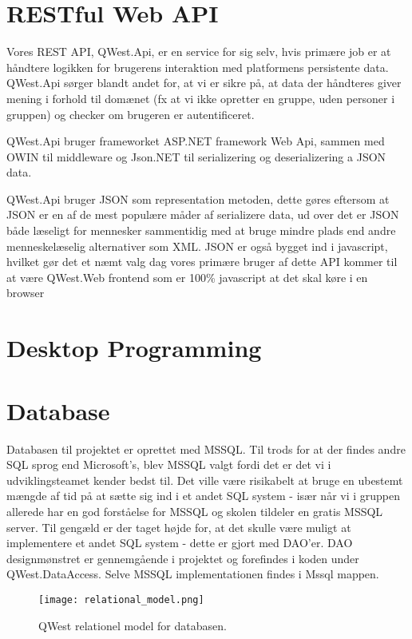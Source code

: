 \section{RESTful Web API}\label{sec:REST}
Vores REST API, QWest.Api, er en service for sig selv, hvis primære job er at håndtere logikken for brugerens interaktion med platformens persistente data. QWest.Api sørger blandt andet for, at vi er sikre på, at data der håndteres giver mening i forhold til domænet (fx at vi ikke opretter en gruppe, uden personer i gruppen) og checker om brugeren er autentificeret.

QWest.Api bruger frameworket ASP.NET framework Web Api, sammen med OWIN\cite{Owin} til middleware og Json.NET til serializering og deserializering a JSON data.

QWest.Api bruger JSON som representation metoden, dette gøres eftersom at JSON er en af de mest populære måder af serializere data, ud over det er JSON både læseligt for mennesker sammentidig med at bruge mindre plads end andre menneskelæselig alternativer som XML. JSON er også bygget ind i javascript, hvilket gør det et næmt valg dag vores primære bruger af dette API kommer til at være QWest.Web frontend som er 100\% javascript at det skal køre i en browser

\section{Desktop Programming}\label{sec:deskProgramming}

\section{Database}\label{sec:database}
Databasen til projektet er oprettet med MSSQL\cite{MSSQL}. Til trods for at der findes andre SQL sprog end Microsoft's, blev MSSQL valgt fordi det er det vi i udviklingsteamet kender bedst til. Det ville være risikabelt at bruge en ubestemt mængde af tid på at sætte sig ind i et andet SQL system - især når vi i gruppen allerede har en god forståelse for MSSQL og skolen tildeler en gratis MSSQL server. Til gengæld er der taget højde for, at det skulle være muligt at implementere et andet SQL system - dette er gjort med DAO'er. DAO\cite{dao} designmønstret er gennemgående i projektet og forefindes i koden under QWest.DataAccess. Selve MSSQL implementationen findes i Mssql mappen. 

\begin{figure}
    \texttt{[image: relational\_model.png]}
    \caption{QWest relationel model for databasen.}
    \label{fig:relational_model}
\end{figure}

